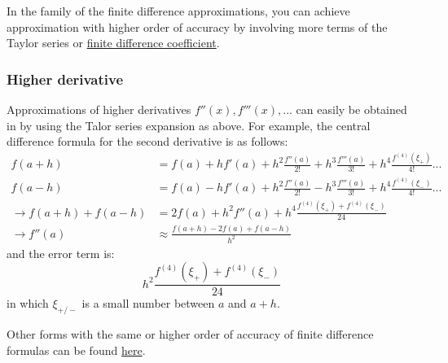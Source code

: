 In the family of the finite difference approximations, you can achieve approximation with higher order of accuracy by involving more terms of the Taylor series or \href{https://en.wikipedia.org/wiki/Finite_difference_coefficient}{finite difference coefficient}.



\subsubsection{Higher derivative}
Approximations of higher derivatives $f''(x), f'''(x),...$ can easily be obtained in by using the Talor series expansion as above. For example, the central difference formula for the second derivative is as follows:
\begin{align}
	f(a+h) &= f(a) + hf'(a) + h^2\frac{f''(a)}{2!} + h^3\frac{f'''(a)}{3!} + h^4\frac{f^{(4)}(\xi_+)}{4!} ... \nonumber \\
	f(a-h) &= f(a) - hf'(a) + h^2\frac{f''(a)}{2!} - h^3\frac{f'''(a)}{3!} + h^4\frac{f^{(4)}(\xi_-)}{4!} ... \nonumber \\
	\rightarrow f(a+h) + f(a-h) &= 2f(a) + h^2f''(a) + h^4 \frac{f^{(4)}(\xi_+) + f^{(4)}(\xi_-)}{24} \nonumber \\
	\rightarrow f''(a) &\approx \frac{f(a+h) - 2f(a) + f(a-h)}{h^2}
\end{align}
and the error term is:
\begin{equation}
	h^2 \frac{f^{(4)}(\xi_+) + f^{(4)}(\xi_-)}{24}
\end{equation}
in which $\xi_{+/-}$ is a small number between $a$ and $a+h$.

Other forms with the same or higher order of accuracy of finite difference formulas can be found \href{https://en.wikipedia.org/wiki/Finite_difference_coefficient}{here}.




